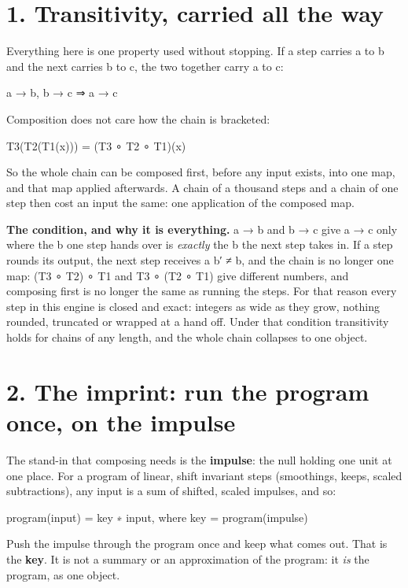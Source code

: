 \section{\texorpdfstring{1. Transitivity, carried all the way}{1. Transitivity, carried all the way}}

Everything here is one property used without stopping. If a step carries a to b and the next carries b to c, the two together carry a to c:

a → b,  b → c   ⇒   a → c

Composition does not care how the chain is bracketed:

T3(T2(T1(x))) = (T3 ∘ T2 ∘ T1)(x)

So the whole chain can be composed first, before any input exists, into one map, and that map applied afterwards. A chain of a thousand steps and a chain of one step then cost an input the same: one application of the composed map.

\textbf{The condition, and why it is everything.} a → b and b → c give a → c only where the b one step hands over is \emph{exactly} the b the next step takes in. If a step rounds its output, the next step receives a b′ ≠ b, and the chain is no longer one map: (T3 ∘ T2) ∘ T1 and T3 ∘ (T2 ∘ T1) give different numbers, and composing first is no longer the same as running the steps. For that reason every step in this engine is closed and exact: integers as wide as they grow, nothing rounded, truncated or wrapped at a hand off. Under that condition transitivity holds for chains of any length, and the whole chain collapses to one object.

\section{\texorpdfstring{2. The imprint: run the program once, on the impulse}{2. The imprint: run the program once, on the impulse}}

The stand-in that composing needs is the \textbf{impulse}: the null holding one unit at one place. For a program of linear, shift invariant steps (smoothings, keeps, scaled subtractions), any input is a sum of shifted, scaled impulses, and so:

program(input) = key ∗ input,    where  key = program(impulse)

Push the impulse through the program once and keep what comes out. That is the \textbf{key}. It is not a summary or an approximation of the program: it \emph{is} the program, as one object.

